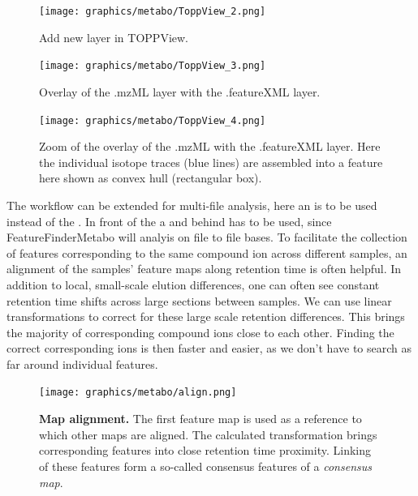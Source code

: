 \begin{figure}[htbp]
  \centering
  \texttt{[image: graphics/metabo/ToppView\_2.png]}
  \caption{Add new layer in TOPPView.}
  \label{fig:ToppView_2}
\end{figure}

\begin{figure}[htbp]
  \centering
  \texttt{[image: graphics/metabo/ToppView\_3.png]}
  \caption{Overlay of the .mzML layer with the .featureXML layer. }
  \label{fig:ToppView_3}
\end{figure}

\begin{figure}[htbp]
  \centering
  \texttt{[image: graphics/metabo/ToppView\_4.png]}
  \caption{Zoom of the overlay of the .mzML with the .featureXML layer. Here the individual isotope traces (blue lines) are assembled into a feature here shown as convex hull (rectangular box).}
  \label{fig:ToppView_4}
\end{figure}

The workflow can be extended for multi-file analysis, here an  is to be used instead of the .  In front of the  a  and behind  has to be used, since FeatureFinderMetabo will analyis on file to file bases. 
\newline
To facilitate the collection of features corresponding to the same compound ion across different samples, an alignment of the samples' feature maps along retention time is often helpful. In addition to local, small-scale elution differences, one can often see constant retention time shifts across large sections between samples. We can use linear transformations to correct for these large scale retention differences. This  brings the majority of corresponding compound ions close to each other. Finding the correct corresponding ions is then faster and easier, as we don't have to search as far around individual features.

\begin{figure}[!htbp]
	\centering
	\texttt{[image: graphics/metabo/align.png]}
	\caption[Map alignment]
	{
	\textbf{Map alignment.} The first feature map is used as a reference to which other maps are aligned. The calculated transformation brings corresponding features into close retention time proximity. Linking of these features form a so-called consensus features of a \textit{consensus map}.
	}
	\label{bg_alignment}
\end{figure}

